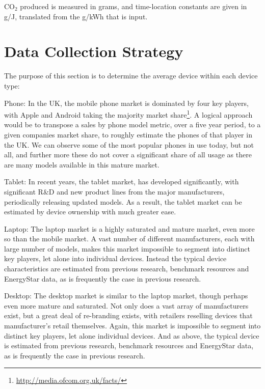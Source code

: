 \documentclass[conference]{IEEEtran}
\begin{document}
CO$_2$ produced is measured in grams, and time-location constants are
given in g/J, translated from the g/kWh that is input.


\section{Data Collection Strategy}


The purpose of this section is to determine the average device within
each device type:

\begin{compactdesc}
\item[Phone:] In the UK, the mobile phone market is dominated by four key players,
with Apple and Android taking the majority market
share\footnote{\url{http://media.ofcom.org.uk/facts/}}. A logical
approach would be to transpose a sales by phone model metric, over a
five year period, to a given companies market share, to roughly
estimate the phones of that player in the UK. We can observe some of
the most popular phones in use today, but not all, and further more
these do not cover a significant share of all usage as there are many
models available in this mature market.

\item[Tablet:] In recent years, the tablet market, has developed
  significantly, with significant R\&D and new product lines from the
  major manufacturers, periodically releasing updated models. 
As a result, the tablet market can be estimated by
device ownership with much greater ease.

\item[Laptop:] The laptop market is a highly saturated and mature market, even more
so than the mobile market. A vast number of different manufacturers,
each with large number of models, makes this market impossible to
segment into distinct key players, let alone into individual devices. 
Instead the typical device characteristics are estimated from previous
research, benchmark resources and EnergyStar data, as is frequently
the case in previous research.

\item[Desktop:] The desktop market is similar to the laptop market, though perhaps
even more mature and saturated. Not only does a vast array of
manufacturers exist, but a great deal of re-branding exists, with
retailers reselling devices that manufacturer’s retail
themselves. Again, this market is impossible to segment into distinct
key players, let alone individual devices. And as above, the typical
device is estimated from previous research, benchmark resources and
EnergyStar data, as is frequently the case in previous research.
\end{compactdesc}
\end{document}
